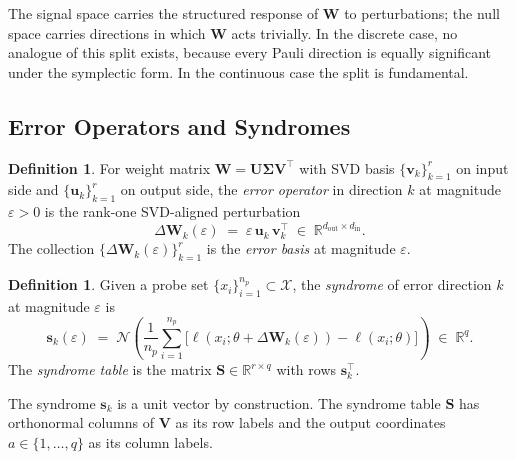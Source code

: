 \documentclass[11pt,a4paper]{article}
\theoremstyle{definition}
\newtheorem{definition}[theorem]{Definition}
\newcommand{\Wm}{\mathbf{W}}
\newcommand{\Um}{\mathbf{U}}
\newcommand{\Vm}{\mathbf{V}}
\newcommand{\Sm}{\mathbf{S}}
\newcommand{\Sig}{\boldsymbol{\Sigma}}
\newcommand{\vk}[1][]{\mathbf{v}_{#1}}
\newcommand{\uk}[1][]{\mathbf{u}_{#1}}
\newcommand{\sk}[1][]{\mathbf{s}_{#1}}
\newcommand{\Rbb}{\mathbb{R}}
\newcommand{\Nop}{\mathcal{N}}
\newcommand{\dimin}{d_{\mathrm{in}}}
\newcommand{\dimout}{d_{\mathrm{out}}}
\begin{document}
The signal space carries the structured response of $\Wm$ to perturbations; the null space carries directions in which $\Wm$ acts trivially. In the discrete case, no analogue of this split exists, because every Pauli direction is equally significant under the symplectic form. In the continuous case the split is fundamental.

\subsection{Error Operators and Syndromes}
\label{sec:errs_syns}

\begin{defbox}
\begin{definition}
\label{def:error_op}
For weight matrix $\Wm = \Um\Sig\Vm^\top$ with SVD basis $\{\vk[k]\}_{k=1}^{r}$ on input side and $\{\uk[k]\}_{k=1}^{r}$ on output side, the \emph{error operator} in direction $k$ at magnitude $\varepsilon > 0$ is the rank-one SVD-aligned perturbation
\begin{equation}
  \Delta\Wm_k(\varepsilon) \;=\; \varepsilon\,\uk[k]\,\vk[k]^\top
  \;\in\; \Rbb^{\dimout\times\dimin}.
  \label{eq:err_op_def}
\end{equation}
The collection $\{\Delta\Wm_k(\varepsilon)\}_{k=1}^{r}$ is the \emph{error basis} at magnitude $\varepsilon$.
\end{definition}
\end{defbox}

\begin{defbox}
\begin{definition}
\label{def:syndrome}
Given a probe set $\{x_i\}_{i=1}^{n_p}\subset\mathcal{X}$, the \emph{syndrome} of error direction $k$ at magnitude $\varepsilon$ is
\begin{equation}
  \sk[k](\varepsilon)
  \;=\; \Nop\!\left(
    \frac{1}{n_p}\sum_{i=1}^{n_p}
    \bigl[\ell(x_i; \theta + \Delta\Wm_k(\varepsilon))
           -\ell(x_i;\theta)\bigr]
  \right) \;\in\; \Rbb^q .
  \label{eq:syndrome_def}
\end{equation}
The \emph{syndrome table} is the matrix $\Sm\in\Rbb^{r\times q}$ with rows $\sk[k]^\top$.
\end{definition}
\end{defbox}

The syndrome $\sk[k]$ is a unit vector by construction. The syndrome table $\Sm$ has orthonormal columns of $\Vm$ as its row labels and the output coordinates $a\in\{1,\ldots,q\}$ as its column labels.
\end{document}

